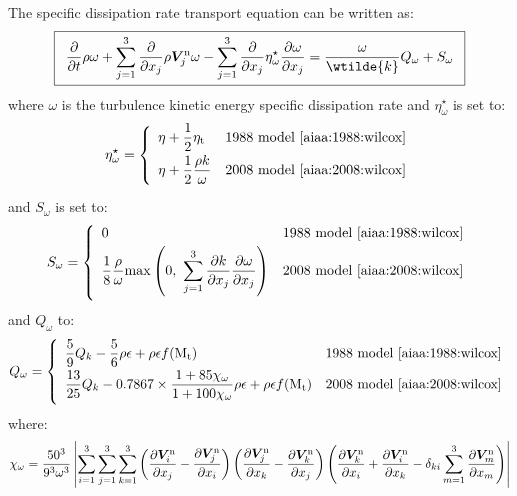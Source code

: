 \documentclass{warpdoc}
\newcommand\frameeqn[1]{\fbox{$\displaystyle #1$}}
\newcommand{\alb}{\vspace{0.1cm}\\} %
\newcommand{\mfd}{\displaystyle}
\newcommand{\visc}{\eta}
\renewcommand{\vec}[1]{\bm{#1}}
\begin{document}
The specific dissipation rate transport equation can be written as:
%
\begin{equation}
\frameeqn{
 \begin{array}{r}
         \mfd \frac{\partial }{\partial t} \rho \omega
        +\mfd\sum_{j=1}^{3}
          \frac{\partial }{\partial x_j} \rho \vec{V}^{\rm n}_j \omega
        -\sum_{j=1}^3 \frac{\partial }{\partial x_j} \visc_\omega^\star \frac{\partial \omega}{\partial x_j}
=  \frac{\omega}{\wtilde{k}} Q_{\omega} + S_{\omega} 
 \end{array}
}
\label{eqn:omega}
\end{equation}
%
where $\omega$ is the turbulence kinetic energy specific dissipation rate and $\visc_\omega^\star$ is set to:
%
\begin{equation}
\visc_\omega^\star=\left\{
\begin{array}{ll}\mfd
\visc +\frac{1}{2}\visc_{\rm t} & \textrm{1988~model~\cite{aiaa:1988:wilcox}}\alb\mfd
\visc +\frac{1}{2}\frac{\rho k}{\omega} & \textrm{2008~model~\cite{aiaa:2008:wilcox}}\alb
\end{array}
\right.
\end{equation}
%
and $S_{\omega}$  is set to:
%
\begin{equation}
S_{\omega}= \left\{
\begin{array}{ll}\mfd
0 & \textrm{1988~model~\cite{aiaa:1988:wilcox}}\alb\mfd
\frac{1}{8}\frac{\rho}{\omega}{\rm max}\left(0,~\sum_{j=1}^3\frac{\partial k}{\partial x_j}\frac{\partial \omega}{\partial x_j}\right) & \textrm{2008~model~\cite{aiaa:2008:wilcox}}\alb
\end{array}
\right.
\end{equation}
%
and $Q_{\omega}$ to:
%
\begin{equation}
Q_{\omega}= \left\{
\begin{array}{ll}\mfd
\frac{5}{9}  Q_k - \frac{5}{6} \rho \epsilon +\rho \epsilon f({\rm M}_{\rm t}) & \textrm{1988~model~\cite{aiaa:1988:wilcox}}\alb\mfd
\frac{13}{25}  Q_k - 0.7867 \times \frac{1+ 85 \chi_\omega}{1+100 \chi_\omega} \rho \epsilon +\rho \epsilon f({\rm M}_{\rm t}) & \textrm{2008~model~\cite{aiaa:2008:wilcox}}\alb
\end{array}
\right.
\end{equation}
%
where:
%
\begin{equation}\mfd
\chi_\omega=\frac{50^3}{9^3 \omega^3}
\left|
\sum_{i=1}^3 \sum_{j=1}^3 \sum_{k=1}^3 
\left(\frac{\partial \vec{V}^{\rm n}_i}{\partial x_j}-\frac{\partial \vec{V}^{\rm n}_j}{\partial x_i} \right)
\left(\frac{\partial \vec{V}^{\rm n}_j}{\partial x_k}-\frac{\partial \vec{V}^{\rm n}_k}{\partial x_j} \right)
\left(\frac{\partial \vec{V}^{\rm n}_k}{\partial x_i}+\frac{\partial \vec{V}^{\rm n}_i}{\partial x_k} 
     - \delta_{ki}\sum_{m=1}^3\frac{\partial \vec{V}^{\rm n}_m}{\partial x_m}  \right)
\right|
\end{equation}
\end{document}
